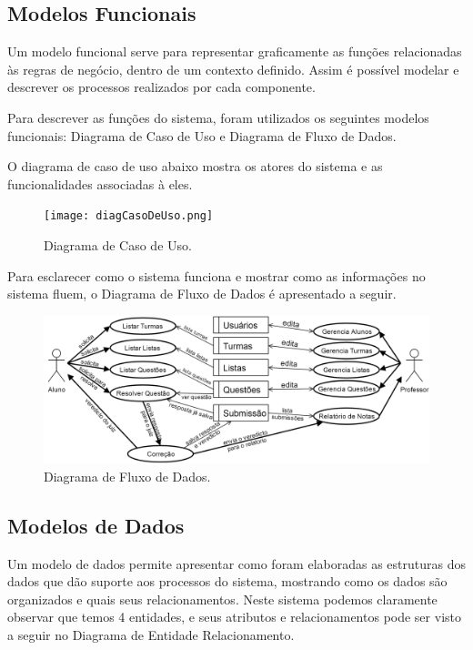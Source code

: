 \documentclass[
	12pt,				%
	openany,
	oneside,
	a4paper,			%
	english,			%
	brazil				%
	]{abntex2}
\begin{document}
\subsection{Modelos Funcionais}

  Um modelo funcional serve para representar graficamente as funções relacionadas às regras de negócio, dentro de um contexto definido. Assim é possível modelar e descrever os processos realizados por cada componente.

  Para descrever as funções do sistema, foram utilizados os seguintes modelos funcionais: Diagrama de Caso de Uso e Diagrama de Fluxo de Dados.

  O diagrama de caso de uso abaixo mostra os atores do sistema e as funcionalidades associadas à eles.

\begin{figure}[H]
  \centering
  \texttt{[image: diagCasoDeUso.png]}%
  \caption{Diagrama de Caso de Uso.}
  \label{fig:DCU}
\end{figure}

  Para esclarecer como o sistema funciona e mostrar como as informações no sistema fluem, o Diagrama de Fluxo de Dados é apresentado a seguir.

\begin{figure}[H]
  \centering
  \includegraphics[width=\textwidth]{diagFluxoDeDados.png}%
  \caption{Diagrama de Fluxo de Dados.}
  \label{fig:DFD}
\end{figure}




\subsection{Modelos de Dados}
  Um modelo de dados permite apresentar como foram elaboradas as estruturas dos dados que dão suporte aos processos do sistema, mostrando como os dados são organizados e quais seus relacionamentos. Neste sistema podemos claramente observar que temos 4 entidades, e seus atributos e relacionamentos pode ser visto a seguir no Diagrama de Entidade Relacionamento.
\end{document}
